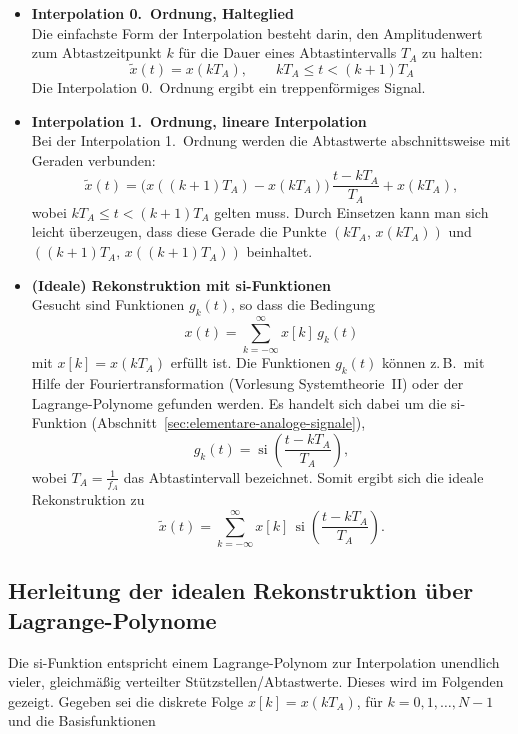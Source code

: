 \begin{itemize}
  \item \textbf{Interpolation 0.\ Ordnung, Halteglied}\\
  Die einfachste Form der Interpolation besteht darin, den Amplitudenwert zum Abtastzeitpunkt $k$ für die Dauer eines Abtastintervalls $T_A$ zu halten:
  $$
  \tilde{x}(t) = x(kT_A), \qquad kT_A \leq t < (k+1)T_A
  $$
  Die Interpolation 0.\ Ordnung ergibt ein treppenförmiges Signal.

  \item \textbf{Interpolation 1.\ Ordnung, lineare Interpolation}\\
  Bei der Interpolation 1.\ Ordnung werden die Abtastwerte abschnittsweise mit Geraden verbunden:
  $$
  \tilde{x}(t) = \bigl(x((k+1)T_A) - x(kT_A)\bigr)\,\frac{t - kT_A}{T_A} + x(kT_A),
  $$
  wobei $kT_A \leq t < (k+1)T_A$ gelten muss. Durch Einsetzen kann man sich leicht überzeugen, dass diese Gerade die Punkte $(kT_A,\, x(kT_A))$ und $((k+1)T_A,\, x((k+1)T_A))$ beinhaltet.

  \item \textbf{(Ideale) Rekonstruktion mit si-Funktionen}\\
  Gesucht sind Funktionen $g_k(t)$, so dass die Bedingung
  $$
  x(t) = \sum_{k=-\infty}^{\infty} x[k]\, g_k(t)
  $$
  mit $x[k] = x(kT_A)$ erfüllt ist. Die Funktionen $g_k(t)$ können z.\,B.\ mit Hilfe der Fouriertransformation (Vorlesung Systemtheorie~II) oder der Lagrange-Polynome gefunden werden. Es handelt sich dabei um die si-Funktion (Abschnitt~\ref{sec:elementare-analoge-signale}),
  $$
  g_k(t) = \operatorname{si}\!\left(\frac{t - kT_A}{T_A}\right),
  $$
  wobei $T_A = \tfrac{1}{f_A}$ das Abtastintervall bezeichnet. Somit ergibt sich die ideale Rekonstruktion zu
  $$
  \tilde{x}(t) = \sum_{k=-\infty}^{\infty} x[k]\, \operatorname{si}\!\left(\frac{t - kT_A}{T_A}\right).
  $$
\end{itemize}


\subsection*{Herleitung der idealen Rekonstruktion über Lagrange-Polynome}

Die si-Funktion entspricht einem Lagrange-Polynom zur Interpolation unendlich vieler, gleichmäßig verteilter Stützstellen/Abtastwerte. Dieses wird im Folgenden gezeigt. Gegeben sei die diskrete Folge $x[k] = x(kT_A)$, für $k = 0, 1, \ldots, N-1$ und die Basisfunktionen

